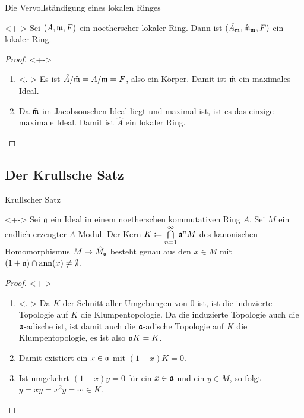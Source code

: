 \begin{frame}{Die Vervollständigung eines lokalen Ringes}
	\begin{proposition}<+->
		Sei \((A, \mathfrak{m}, F)\) ein noetherscher lokaler Ring. Dann ist
		\((\hat A_{\mathfrak{m}}, \hat{\mathfrak{m}}_{\mathfrak{m}}, F)\) ein lokaler Ring.
	\end{proposition}
	\begin{proof}<+->
		\begin{enumerate}[<+->]
		\item<.->
			Es ist \(\hat A/\hat{\mathfrak{m}} = A/\mathfrak{m} = F\), also ein Körper.  Damit ist
			\(\hat {\mathfrak{m}}\) ein maximales Ideal.
		\item
			Da \(\hat {\mathfrak{m}}\) im Jacobsonschen Ideal liegt und maximal ist, ist es das einzige
			maximale Ideal. Damit ist \(\hat A\) ein lokaler Ring.
			\qedhere
		\end{enumerate}
	\end{proof}
\end{frame}

\subsection{Der Krullsche Satz}

\begin{frame}{Krullscher Satz}
	\begin{theorem}<+->
		\label{thm:krull}
		Sei \(\mathfrak{a}\) ein Ideal in einem noetherschen kommutativen Ring \(A\). Sei
		\(M\) ein endlich erzeugter \(A\)-Modul. Der Kern \(K \coloneqq \bigcap\limits_{n = 1}^\infty
		\mathfrak{a}^n M\) des kanonischen Homomorphismus \(M \to \hat M_{\mathfrak{a}}\) besteht genau
		aus den \(x \in M\) mit \((1 + \mathfrak{a}) \cap \operatorname{ann}(x) \neq \emptyset\).
	\end{theorem}
	\begin{proof}<+->
		\begin{enumerate}[<+->]
		\item<.->
			Da \(K\) der Schnitt aller Umgebungen von \(0\) ist, ist die induzierte Topologie auf \(K\)
			die Klumpentopologie. Da die induzierte Topologie auch die \(\mathfrak{a}\)-adische ist,
			ist damit auch die \(\mathfrak{a}\)-adische Topologie auf \(K\)
			die Klumpentopologie, es ist also \(\mathfrak{a} K = K\).
		\item
			Damit existiert ein \(x \in \mathfrak{a}\) mit \((1 - x) K = 0\). 
		\item
			Ist umgekehrt \((1 - x) y = 0\) für ein \(x \in \mathfrak{a}\) und ein \(y \in M\), 
			so folgt \(y = x y = x^2 y = \dotsb \in K\).
			\qedhere
		\end{enumerate}
	\end{proof}
\end{frame}

